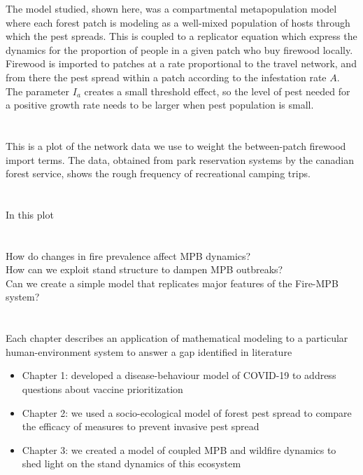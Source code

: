 \documentclass{article}
\begin{document}
The model studied, shown here, was a compartmental metapopulation model where each forest patch is modeling as a well-mixed population of hosts through which the pest spreads. This is coupled to a replicator equation which express the dynamics for the proportion of people in a given patch who buy firewood locally. Firewood is imported to patches at a rate proportional to the travel network, and from there the pest spread within a patch according to the infestation rate $A$. The parameter $I_a$ creates a small threshold effect, so the level of pest needed for a positive growth rate needs to be larger when pest population is small. 

\section{}

This is a plot of the network data we use to weight the between-patch firewood import terms. The data, obtained from park reservation systems by the canadian forest service, shows the rough frequency of recreational camping trips.

\section{}




\section{}

In this plot 


\section{}
How do changes in fire prevalence affect MPB dynamics?   \\
\vspace{0.5cm}
How can we exploit stand structure to dampen MPB outbreaks? \\
\vspace{0.5cm}
Can we create a simple model that replicates major features of the Fire-MPB system?

\section{}
Each chapter describes an application of mathematical modeling to a particular human-environment system to answer a gap identified in literature
\begin{itemize}
    \item Chapter 1: developed a disease-behaviour model of COVID-19 to address questions about vaccine prioritization
    \item Chapter 2: we used a socio-ecological model of forest pest spread to compare the efficacy of measures to prevent invasive pest spread
    \item Chapter 3: we created a model of coupled MPB and wildfire dynamics to shed light on the stand dynamics of this ecosystem 
\end{itemize}
\section{}
\end{document}
